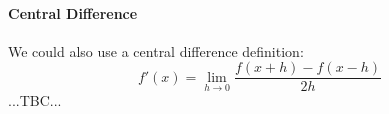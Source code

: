 \paragraph{Central Difference} 
We could also use a central difference definition:
\begin{equation}
 f'(x) = \lim_{h \rightarrow 0} \frac{f(x+h) - f(x-h)}{2 h}
\end{equation}
...TBC...



